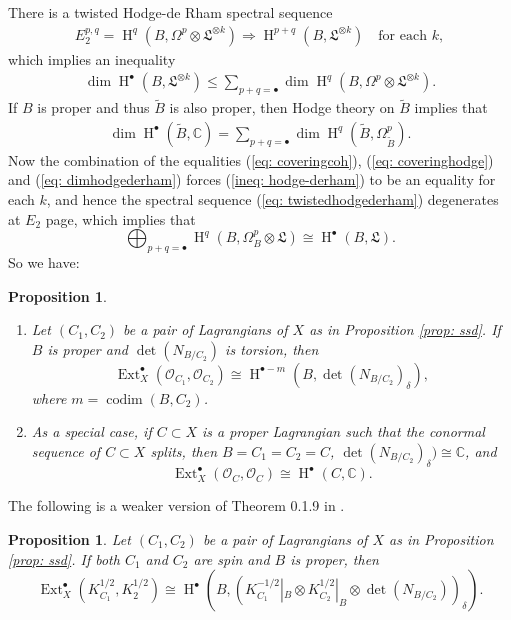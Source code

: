 \documentclass[12pt]{amsart}
\newtheorem{proposition}[theorem]{Proposition}
\theoremstyle{definition}
\theoremstyle{remark}
\numberwithin{equation}{section}
\newcommand{\CC}{\mathbb{C}}
\newcommand{\shO}{\mathcal{O}}
\newcommand{\codim}{\operatorname{codim}}
\newcommand{\Ext}{\operatorname{Ext}}
\newcommand{\Hdot}{\operatorname{H}}
\begin{document}
There is a twisted Hodge-de Rham spectral sequence
\begin{align}\label{eq: twistedhodgederham}
    E_2^{p, q}=\Hdot^{q}(B, \Omega^p\otimes\mathfrak{L}^{\otimes k})\Longrightarrow \Hdot^{p+q}(B, \mathfrak{L}^{\otimes k}) \quad \text{for each }k, 
\end{align}
which implies an inequality
\begin{align}\label{ineq: hodge-derham}
    \dim \Hdot^{\bullet}(B, \mathfrak{L}^{\otimes k})\leq \sum_{p+q=\bullet}\dim \Hdot^{q}(B, \Omega^p\otimes\mathfrak{L}^{\otimes k}).
\end{align}
If $B$ is proper and thus $\tilde{B}$ is also proper, then Hodge theory on $\widetilde{B}$ implies that 
\begin{align}\label{eq: dimhodgederham}
    \dim \Hdot^{\bullet}(\widetilde{B}, \CC)=\sum_{p+q=\bullet} \dim \Hdot^{q}(\widetilde{B}, \Omega^p_{\widetilde{B}}).
\end{align}
Now the combination of the equalities (\ref{eq: coveringcoh}), (\ref{eq: coveringhodge}) and (\ref{eq: dimhodgederham}) forces (\ref{ineq: hodge-derham}) to be an equality for each $k$, and hence the spectral sequence (\ref{eq: twistedhodgederham}) degenerates at $E_2$ page, which implies that 
$$\bigoplus_{p+q=\bullet}
\Hdot^q(B, \Omega_{B}^{p}\otimes \mathfrak{L})\cong \Hdot^{\bullet}(B, \mathfrak{L}).$$
So we have:
\begin{proposition}\label{prop: Ext}
\begin{enumerate} 
\item Let $(C_1, C_2)$ be a pair of Lagrangians of $X$ as in Proposition \ref{prop: ssd}. If $B$ is proper and $\det(N_{B/C_2})$ is torsion, then
$$\Ext_X^{\bullet}(\shO_{C_1},\shO_{C_2})\cong \Hdot^{\bullet-m}(B, \det(N_{B/C_2})_{\delta}),$$ where $m=\codim(B, C_2)$.
\item As a special case, if $C\subset X$ is a proper Lagrangian such that the conormal sequence of $C\subset X$ splits, then $B=C_1=C_2=C$, $\det(N_{B/C_2})_{\delta})\cong\CC$, and 
$$ \Ext^{\bullet}_X(\shO_C, \shO_C)\cong \Hdot^{\bullet}(C,\CC).$$
\end{enumerate}
\end{proposition}
The following is a weaker version of Theorem 0.1.9 in \cite{mladenov2024formality}. 
\begin{proposition}\label{prop: spinlag}
    Let $(C_1, C_2)$ be a pair of Lagrangians of $X$ as in Proposition \ref{prop: ssd}. If both $C_1$ and $C_2$ are spin and $B$ is proper, then 
$$ \Ext^{\bullet}_X(K_{C_1}^{1/2}, K_2^{1/2})\cong \Hdot^{\bullet}(B,(K_{C_1}^{-1/2}|_B\otimes K_{C_2}^{1/2}|_B\otimes \det(N_{B/C_2}))_{\delta}).$$
\end{proposition}
\end{document}

